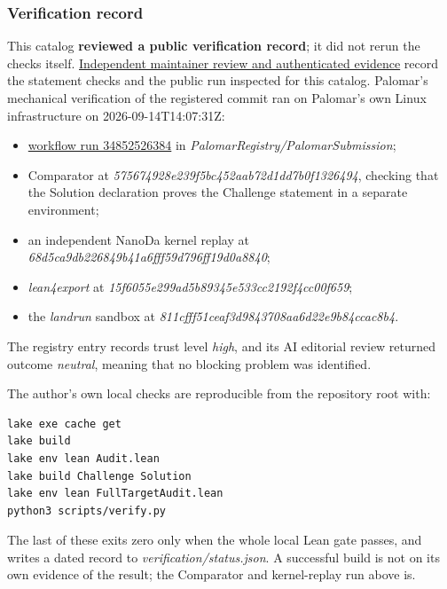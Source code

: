 \documentclass[11pt,a4paper]{article}
\providecommand{\tightlist}{\setlength{\itemsep}{0pt}\setlength{\parskip}{0pt}}
\begin{document}
\subsubsection{Verification record}\label{verification-record}

This catalog \textbf{reviewed a public verification record}; it did not
rerun the checks itself.
\href{https://github.com/ajt60gaibb/OpenProblemsInNLA/blob/main/reviews/2026-09-14-pr257/README.md}{Independent
maintainer review and authenticated evidence} record the statement
checks and the public run inspected for this catalog. Palomar's
mechanical verification of the registered commit ran on Palomar's own
Linux infrastructure on 2026-09-14T14:07:31Z:

\begin{itemize}
\tightlist
\item
  \href{https://github.com/PalomarRegistry/PalomarSubmission/actions/runs/34852526384}{workflow
  run 34852526384} in \textit{PalomarRegistry/PalomarSubmission};
\item
  Comparator at \textit{575674928e239f5bc452aab72d1dd7b0f1326494},
  checking that the Solution declaration proves the Challenge statement
  in a separate environment;
\item
  an independent NanoDa kernel replay at
  \textit{68d5ca9db226849b41a6fff59d796ff19d0a8840};
\item
  \textit{lean4export} at
  \textit{15f6055e299ad5b89345e533cc2192f4cc00f659};
\item
  the \textit{landrun} sandbox at
  \textit{811cfff51ceaf3d9843708aa6d22e9b84ccac8b4}.
\end{itemize}

The registry entry records trust level \textit{high}, and its AI
editorial review returned outcome \textit{neutral}, meaning that no
blocking problem was identified.

The author's own local checks are reproducible from the repository root
with:

\begin{verbatim}
lake exe cache get
lake build
lake env lean Audit.lean
lake build Challenge Solution
lake env lean FullTargetAudit.lean
python3 scripts/verify.py
\end{verbatim}

The last of these exits zero only when the whole local Lean gate passes,
and writes a dated record to \textit{verification/status.json}. A
successful build is not on its own evidence of the result; the
Comparator and kernel-replay run above is.
\end{document}
